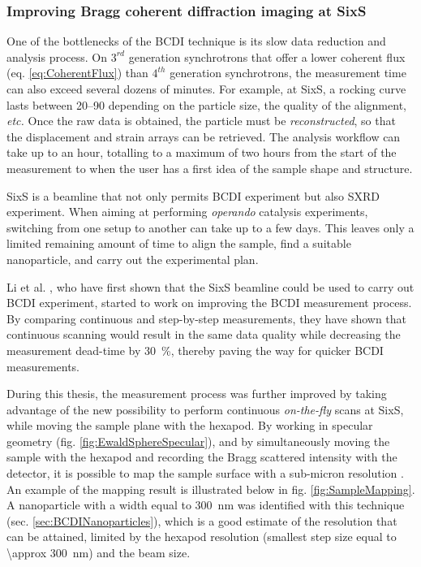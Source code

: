 \subsubsection{Improving Bragg coherent diffraction imaging at SixS}

One of the bottlenecks of the BCDI technique is its slow data reduction and analysis process.
On $3^{rd}$ generation synchrotrons that offer a lower coherent flux (eq. \ref{eq:CoherentFlux}) than $4^{th}$ generation synchrotrons, the measurement time can also exceed several dozens of minutes.
For example, at SixS, a rocking curve lasts between \qtyrange{20}{90}{\min} depending on the particle size, the quality of the alignment, \textit{etc.}
Once the raw data is obtained, the particle must be \textit{reconstructed}, so that the displacement and strain arrays can be retrieved.
The analysis workflow can take up to an hour, totalling to a maximum of two hours from the start of the measurement to when the user has a first idea of the sample shape and structure.

SixS is a beamline that not only permits BCDI experiment but also SXRD experiment.
When aiming at performing \textit{operando} catalysis experiments, switching from one setup to another can take up to a few days.
This leaves only a limited remaining amount of time to align the sample, find a suitable nanoparticle, and carry out the experimental plan.

Li et al. \parencite*{Li2020}, who have first shown that the SixS beamline could be used to carry out BCDI experiment, started to work on improving the BCDI measurement process.
By comparing continuous and step-by-step measurements, they have shown that continuous scanning would result in the same data quality while decreasing the measurement dead-time by \qty{30}{\percent}, thereby paving the way for quicker BCDI measurements.

During this thesis, the measurement process was further improved by taking advantage of the new possibility to perform continuous \textit{on-the-fly} scans at SixS, while moving the sample plane with the hexapod.
By working in specular geometry (fig. \ref{fig:EwaldSphereSpecular}), and by simultaneously moving the sample with the hexapod and recording the Bragg scattered intensity with the detector, it is possible to map the sample surface with a sub-micron resolution \parencite{Chahine2014}.
An example of the mapping result is illustrated below in fig. \ref{fig:SampleMapping}.
A nanoparticle with a width equal to \qty{300}{\nm} was identified with this technique (sec. \ref{sec:BCDINanoparticles}), which is a good estimate of the resolution that can be attained, limited by the hexapod resolution (smallest step size equal to \qty{\approx 300}{\nm}) and the beam size.

